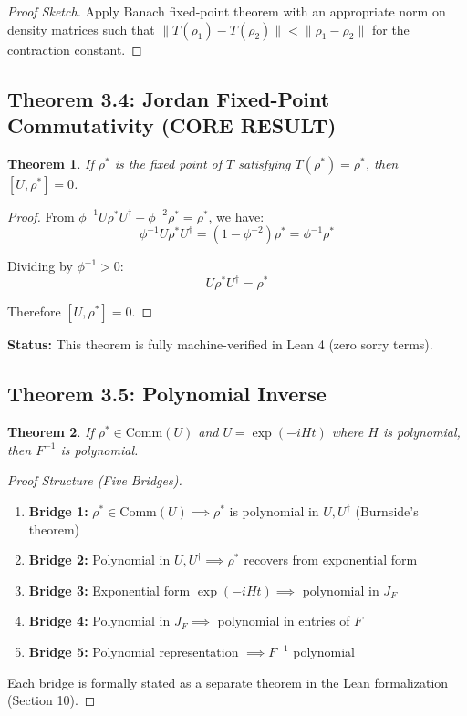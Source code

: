\documentclass[11pt,a4paper]{article}
\theoremstyle{plain}
\newtheorem{theorem}{Theorem}[section]
\theoremstyle{definition}
\begin{document}
\begin{proof}[Proof Sketch]
Apply Banach fixed-point theorem with an appropriate norm on density matrices such that $\|T(\rho_1) - T(\rho_2)\| < \|\rho_1 - \rho_2\|$ for the contraction constant.
\end{proof}

\subsection{Theorem 3.4: Jordan Fixed-Point Commutativity (CORE RESULT)}

\begin{theorem}
If $\rho^*$ is the fixed point of $T$ satisfying $T(\rho^*) = \rho^*$, then $[U, \rho^*] = 0$.
\end{theorem}

\begin{proof}
From $\phi^{-1} U \rho^* U^\dagger + \phi^{-2} \rho^* = \rho^*$, we have:
$$\phi^{-1} U \rho^* U^\dagger = (1 - \phi^{-2}) \rho^* = \phi^{-1} \rho^*$$

Dividing by $\phi^{-1} > 0$:
$$U \rho^* U^\dagger = \rho^*$$

Therefore $[U, \rho^*] = 0$.
\end{proof}

\textbf{Status:} This theorem is fully machine-verified in Lean 4 (zero sorry terms).

\subsection{Theorem 3.5: Polynomial Inverse}

\begin{theorem}
If $\rho^* \in \mathrm{Comm}(U)$ and $U = \exp(-iHt)$ where $H$ is polynomial, then $F^{-1}$ is polynomial.
\end{theorem}

\begin{proof}[Proof Structure (Five Bridges)]
\begin{enumerate}
  \item \textbf{Bridge 1:} $\rho^* \in \mathrm{Comm}(U) \implies \rho^*$ is polynomial in $U, U^\dagger$ (Burnside's theorem)
  \item \textbf{Bridge 2:} Polynomial in $U, U^\dagger \implies \rho^*$ recovers from exponential form
  \item \textbf{Bridge 3:} Exponential form $\exp(-iHt) \implies$ polynomial in $J_F$
  \item \textbf{Bridge 4:} Polynomial in $J_F \implies$ polynomial in entries of $F$
  \item \textbf{Bridge 5:} Polynomial representation $\implies F^{-1}$ polynomial
\end{enumerate}

Each bridge is formally stated as a separate theorem in the Lean formalization (Section 10).
\end{proof}
\end{document}
